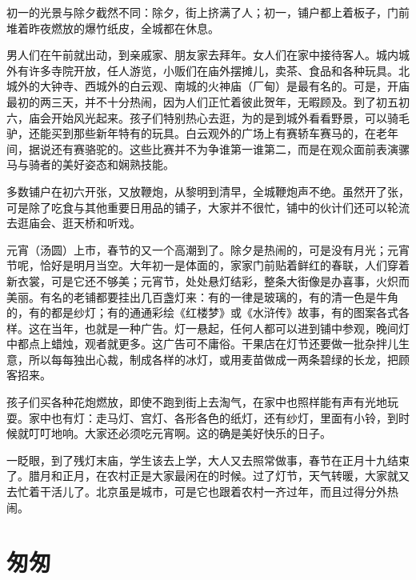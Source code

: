 \documentclass[12pt,UTF-8,openany]{ctexbook}
\begin{document}
\begin{large}
    初一的光景与除夕截然不同：除夕，街上挤满了人；初一，铺户都上着板子，门前堆着昨夜燃放的爆竹纸皮，全城都在休息。
    
    男人们在午前就出动，到亲戚家、朋友家去拜年。女人们在家中接待客人。城内城外有许多寺院开放，任人游览，小贩们在庙外摆摊儿，卖茶、食品和各种玩具。北城外的大钟寺、西城外的白云观、南城的火神庙（厂甸）是最有名的。可是，开庙最初的两三天，并不十分热闹，因为人们正忙着彼此贺年，无暇顾及。到了初五初六，庙会开始风光起来。孩子们特别热心去逛，为的是到城外看看野景，可以骑毛驴，还能买到那些新年特有的玩具。白云观外的广场上有赛轿车赛马的，在老年间，据说还有赛骆驼的。这些比赛并不为争谁第一谁第二，而是在观众面前表演骡马与骑者的美好姿态和娴熟技能。
    
    多数铺户在初六开张，又放鞭炮，从黎明到清早，全城鞭炮声不绝。虽然开了张，可是除了吃食与其他重要日用品的铺子，大家并不很忙，铺中的伙计们还可以轮流去逛庙会、逛天桥和听戏。
    
    元宵（汤圆）上市，春节的又一个高潮到了。除夕是热闹的，可是没有月光；元宵节呢，恰好是明月当空。大年初一是体面的，家家门前贴着鲜红的春联，人们穿着新衣裳，可是它还不够美；元宵节，处处悬灯结彩，整条大街像是办喜事，火炽而美丽。有名的老铺都要挂出几百盏灯来：有的一律是玻璃的，有的清一色是牛角的，有的都是纱灯；有的通通彩绘《红楼梦》或《水浒传》故事，有的图案各式各样。这在当年，也就是一种广告。灯一悬起，任何人都可以进到铺中参观，晚间灯中都点上蜡烛，观者就更多。这广告可不庸俗。干果店在灯节还要做一批杂拌儿生意，所以每每独出心裁，制成各样的冰灯，或用麦苗做成一两条碧绿的长龙，把顾客招来。
    
    孩子们买各种花炮燃放，即使不跑到街上去淘气，在家中也照样能有声有光地玩耍。家中也有灯：走马灯、宫灯、各形各色的纸灯，还有纱灯，里面有小铃，到时候就叮叮地响。大家还必须吃元宵啊。这的确是美好快乐的日子。
    
    一眨眼，到了残灯末庙，学生该去上学，大人又去照常做事，春节在正月十九结束了。腊月和正月，在农村正是大家最闲在的时候。过了灯节，天气转暖，大家就又去忙着干活儿了。北京虽是城市，可是它也跟着农村一齐过年，而且过得分外热闹。
    
\end{large}



\chapter{匆匆}
\end{document}
